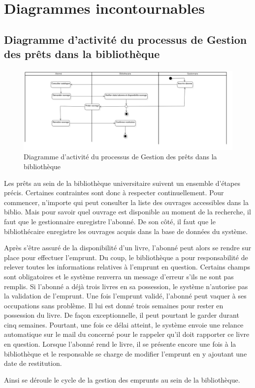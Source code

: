 \section{Diagrammes incontournables}
\subsection{Diagramme d’activité du processus de Gestion des prêts dans la bibliothèque}
\paragraph{}
\begin{figure}[h]
        \centering
        \includegraphics[width=1\textwidth]{ActivityDiagram1}
        \caption{Diagramme d’activité du processus de Gestion des prêts dans la bibliothèque}
        \label{image-ActivityDiagram1}
        \end{figure}
\par
Les prêts au sein de la bibliothèque universitaire suivent un ensemble d'étapes précis.
Certaines contraintes sont donc à respecter continuellement. Pour commencer, n'importe qui 
peut consulter la liste des ouvrages accessibles dans la biblio. Mais pour savoir quel 
ouvrage est disponible au moment de la recherche, il faut que le gestionnaire enregistre 
l'abonné. De son côté, il faut que le bibliothécaire enregistre les ouvrages acquis 
dans la base de données du système. \par 
Après s'être assuré de la disponibilité d'un livre, l'abonné peut alors se rendre sur 
place pour effectuer l'emprunt. Du coup, le bibliothèque a pour responsabilité de relever
toutes les informations relatives à l'emprunt en question. Certains champs sont obligatoires
et le système renverra un message d'erreur s'ils ne sont pas remplis. Si l'abonné a déjà 
trois livres en sa possession, le système n'autorise pas la validation de l'emprunt.
Une fois l'emprunt validé, l'abonné peut vaquer à ses occupations sans problème. Il lui 
est donné trois semaines pour rester en possession du livre. De façon exceptionnelle, il 
peut pourtant le garder durant cinq semaines. Pourtant, une fois ce délai atteint, le 
système envoie une relance automatique sur le mail du concerné pour le rappeler qu'il doit 
rapporter ce livre en question.
Lorsque l'abonné rend le livre, il se présente encore une fois à la bibliothèque et le 
responsable se charge de modifier l'emprunt en y ajoutant une date de restitution. \par 
Ainsi se déroule le cycle de la gestion des emprunts au sein de la bibliothèque.
